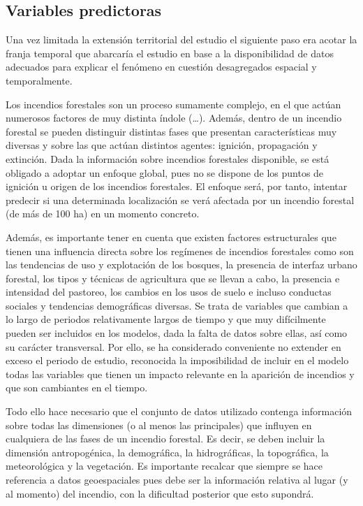 \documentclass[12pt,a4paper,]{book}
\numberwithin{dummy}{section}
\theoremstyle{ocrenumbox}
\theoremstyle{blacknumex}
\theoremstyle{blacknumbox}
\theoremstyle{ocrenum}
\theoremstyle{ocrenum}
\begin{document}
\hypertarget{variables-predictoras}{%
\subsection{Variables predictoras}\label{variables-predictoras}}

Una vez limitada la extensión territorial del estudio el siguiente paso
era acotar la franja temporal que abarcaría el estudio en base a la
disponibilidad de datos adecuados para explicar el fenómeno en cuestión
desagregados espacial y temporalmente.

Los incendios forestales son un proceso sumamente complejo, en el que
actúan numerosos factores de muy distinta índole (\ldots). Además,
dentro de un incendio forestal se pueden distinguir distintas fases que
presentan características muy diversas y sobre las que actúan distintos
agentes: ignición, propagación y extinción. Dada la información sobre
incendios forestales disponible, se está obligado a adoptar un enfoque
global, pues no se dispone de los puntos de ignición u origen de los
incendios forestales. El enfoque será, por tanto, intentar predecir si
una determinada localización se verá afectada por un incendio forestal
(de más de 100 ha) en un momento concreto.

Además, es importante tener en cuenta que existen factores estructurales
que tienen una influencia directa sobre los regímenes de incendios
forestales como son las tendencias de uso y explotación de los bosques,
la presencia de interfaz urbano forestal, los tipos y técnicas de
agricultura que se llevan a cabo, la presencia e intensidad del
pastoreo, los cambios en los usos de suelo e incluso conductas sociales
y tendencias demográficas diversas. Se trata de variables que cambian a
lo largo de periodos relativamente largos de tiempo y que muy
difícilmente pueden ser incluidos en los modelos, dada la falta de datos
sobre ellas, así como su carácter transversal. Por ello, se ha
considerado conveniente no extender en exceso el periodo de estudio,
reconocida la imposibilidad de incluir en el modelo todas las variables
que tienen un impacto relevante en la aparición de incendios y que son
cambiantes en el tiempo.

Todo ello hace necesario que el conjunto de datos utilizado contenga
información sobre todas las dimensiones (o al menos las principales) que
influyen en cualquiera de las fases de un incendio forestal. Es decir,
se deben incluir la dimensión antropogénica, la demográfica, la
hidrográficas, la topográfica, la meteorológica y la vegetación. Es
importante recalcar que siempre se hace referencia a datos geoespaciales
pues debe ser la información relativa al lugar (y al momento) del
incendio, con la dificultad posterior que esto supondrá.
\end{document}
